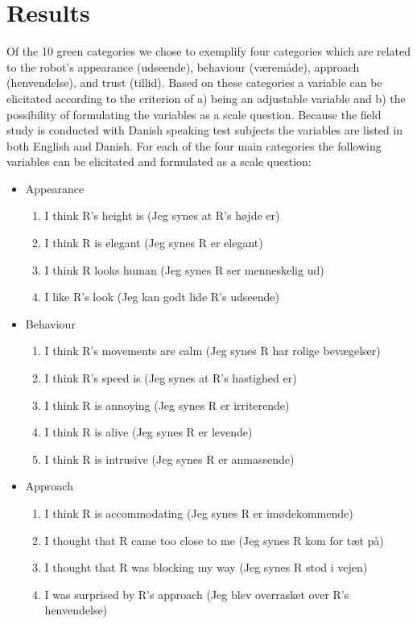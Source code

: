 \section{Results}
\label{Results}
%
Of the 10 green categories we chose to exemplify four categories which are related to the robot’s appearance (udseende), behaviour (væremåde), approach (henvendelse), and trust (tillid). Based on these categories a variable can be elicitated according to the criterion of a) being an adjustable variable and b) the possibility of formulating the variables as a scale question. Because the field study is conducted with Danish speaking test subjects the variables are listed in both English and Danish. For each of the four main categories the following variables can be elicitated and formulated as a scale question:\\
%
\begin{itemize}
\item Appearance
\begin{enumerate}
  \item I think R's height is (Jeg synes at R's højde er)
  \item I think R is elegant (Jeg synes R er elegant)
  \item I think R looks human (Jeg synes R ser menneskelig ud)
  \item I like R's look (Jeg kan godt lide R's udseende)
\end{enumerate}
\item Behaviour
\begin{enumerate}
  \item I think R's movements are calm (Jeg synes R har rolige bevægelser)
  \item I think R's speed is (Jeg synes at R's hastighed er)
  \item I think R is annoying (Jeg synes R er irriterende)
  \item I think R is alive (Jeg synes R er levende)
  \item I think R is intrusive (Jeg synes R er anmassende)
\end{enumerate}
\item Approach 
\begin{enumerate}
  \item I think R is accommodating (Jeg synes R er imødekommende)
  \item I thought that R came too close to me (Jeg synes R kom for tæt på)
  \item I thought that R was blocking my way (Jeg synes R stod i vejen)
  \item I was surprised by R's approach (Jeg blev overrasket over R's henvendelse)

\end{enumerate}
\end{itemize}
